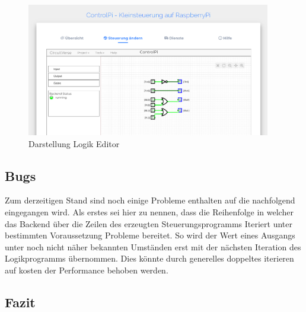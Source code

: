  \begin{figure}[H]
	\begin{center}
		\includegraphics[width=0.95\textwidth]{./images/FrontendAendern.png}
		\caption{Darstellung Logik Editor}
		\label{img:FrontendAenderung}
	\end{center} 
\end{figure}	


 \subsection{Bugs}
 Zum derzeitigen Stand sind noch einige Probleme enthalten auf die nachfolgend eingegangen wird. Als  erstes sei hier zu nennen, dass die Reihenfolge in welcher das Backend über die Zeilen des erzeugten Steuerungsprogramms Iteriert unter bestimmten Voraussetzung Probleme bereitet. So wird der Wert eines Ausgangs unter noch nicht näher bekannten Umständen erst mit der nächsten Iteration des Logikprogramms übernommen. Dies könnte durch generelles doppeltes iterieren auf kosten der Performance behoben werden. 
 
 \subsection{Fazit}
